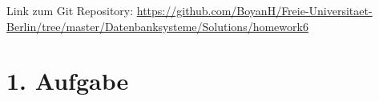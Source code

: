 \usepackage{graphicx}
\usepackage{fancyvrb}

\newcommand{\dozent}{Prof. Dr. Agn`es Voisard, Nicolas Lehmann}					%
\newcommand{\tutor}{Nicolas Lehmann}						%
\newcommand{\tutoriumNo}{10}				%
\newcommand{\projectNo}{6}									%
\newcommand{\veranstaltung}{Datenbanksysteme}	%
\newcommand{\semester}{SoSe 2017}						%
\newcommand{\studenten}{Boyan Hristov, Julian Habib}			%




Link zum Git Repository: \url{https://github.com/BoyanH/Freie-Universitaet-Berlin/tree/master/Datenbanksysteme/Solutions/homework\projectNo}


\section*{1. Aufgabe}

